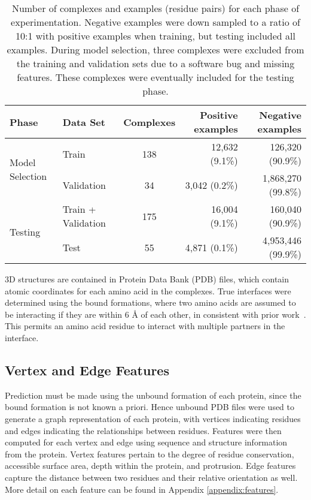 \begin{table}
	\centering
	\begin{tabular}{l l c r r}
		\toprule
		Phase & Data Set & Complexes & Positive examples  & Negative examples \\ 
		\midrule
		\multirow{2}{*}{Model Selection} 
			& Train      & 138       & 12,632 (9.1\%)     & 126,320 (90.9\%) \\
			& Validation & 34        & 3,042 (0.2\%) 		& 1,868,270 (99.8\%) \\
		\midrule
		\multirow{2}{*}{Testing}
			& Train + Validation & 175 & 16,004 (9.1\%) & 160,040 (90.9\%) \\
			& Test       & 55        & 4,871 (0.1\%)      & 4,953,446 (99.9\%) \\ 
		\bottomrule
	\end{tabular}
	\caption{Number of complexes and examples (residue pairs) for each phase of experimentation. Negative examples were down sampled to a ratio of 10:1 with positive examples when training, but testing included all examples. During model selection, three complexes were excluded from the training and validation sets due to a software bug and missing features. These complexes were eventually included for the testing phase. \label{tab:dataset_size}}
	\label{tab:examples}
\end{table}

3D structures are contained in Protein Data Bank (PDB) files, which contain atomic coordinates for each amino acid in the complexes.
True interfaces were determined using the bound formations, where two amino acids are assumed to be interacting if they are within 6 \AA{} of each other, in consistent with prior work~\cite{ofran2007, ahmad2011, minhas2014}.
This permits an amino acid residue to interact with multiple partners in the interface.

\subsection{Vertex and Edge Features}
Prediction must be made using the unbound formation of each protein, since the bound formation is not known a priori.
Hence unbound PDB files were used to generate a graph representation of each protein, with vertices indicating residues and edges indicating the relationships between residues.
Features were then computed for each vertex and edge using sequence and structure information from the protein.
Vertex features pertain to the degree of residue conservation, accessible surface area, depth within the protein, and protrusion.
Edge features capture the distance between two residues and their relative orientation as well.
More detail on each feature can be found in Appendix \ref{appendix:features}.

